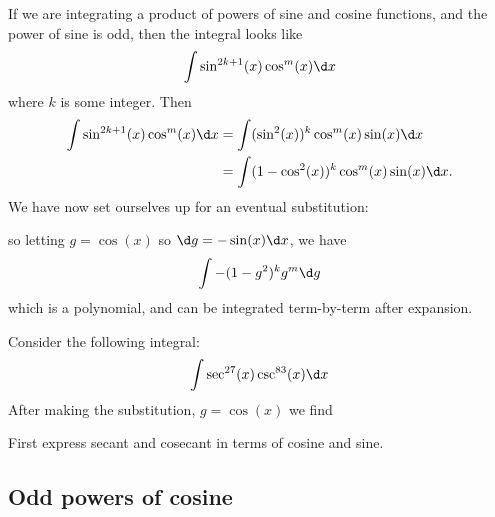 \documentclass{ximera}
\begin{document}
If we are integrating a product of powers of sine and cosine
functions, and the power of sine is odd, then the integral looks like
\[
\int \sin^{2k+1}(x) \cos^m(x) \d x
\]
where $k$ is some integer.  Then
\begin{align*}
  \int \sin^{2k+1}(x) \cos^m(x) \d x &=\int(\sin^{2}(x))^k \cos^m(x) \sin(x) \d x\\
  &= \int (1-\cos^2(x))^k \cos^m(x) \sin(x)\d x.
\end{align*}
We have now set ourselves up for an eventual substitution:
\begin{center}%
\end{center}
so letting $g = \cos(x)$ so $\d g =-\sin(x) \d x$, we have
\[
\int -(1-g^2)^k g^m \d g
\]
which is a polynomial, and can be integrated term-by-term after
expansion.


\begin{question}
  Consider the following integral:
  \[
  \int \sec^{27}(x)\csc^{83}(x) \d x
  \]
  After making the substitution, $g = \cos(x)$ we find
  \begin{hint}
    First express secant and cosecant in terms of cosine and sine.
  \end{hint}\begin{multipleChoice}
  \end{multipleChoice}
\end{question}



\subsection{Odd powers of cosine}
\end{document}
